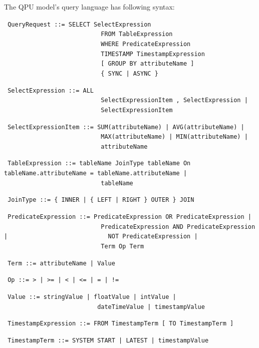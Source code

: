 \medskip
\noindent
The QPU model's query language has following syntax:

{\obeylines\obeyspaces
\texttt{
QueryRequest          ::=  SELECT SelectExpression
~~~~~~~~~~~~~~~~~~~~~~~~~~~FROM TableExpression
~~~~~~~~~~~~~~~~~~~~~~~~~~~WHERE PredicateExpression
~~~~~~~~~~~~~~~~~~~~~~~~~~~TIMESTAMP TimestampExpression 
~~~~~~~~~~~~~~~~~~~~~~~~~~~[ GROUP BY attributeName ]
~~~~~~~~~~~~~~~~~~~~~~~~~~~\{ SYNC | ASYNC \}
}}

{\obeylines\obeyspaces
\texttt{
SelectExpression      ::=  ALL
~~~~~~~~~~~~~~~~~~~~~~~~~~~SelectExpressionItem , SelectExpression |
~~~~~~~~~~~~~~~~~~~~~~~~~~~SelectExpressionItem
}}

{\obeylines\obeyspaces
\texttt{
SelectExpressionItem  ::=  SUM(attributeName) | AVG(attributeName) |
~~~~~~~~~~~~~~~~~~~~~~~~~~~MAX(attributeName) | MIN(attributeName) |
~~~~~~~~~~~~~~~~~~~~~~~~~~~attributeName
}}

{\obeylines\obeyspaces
\texttt{
TableExpression       ::=  tableName JoinType tableName On tableName.attributeName = tableName.attributeName |
~~~~~~~~~~~~~~~~~~~~~~~~~~~tableName
}}

{\obeylines\obeyspaces
\texttt{
JoinType              ::=  \{ INNER | \{ LEFT | RIGHT \} OUTER \} JOIN
}}

{\obeylines\obeyspaces
\texttt{
PredicateExpression   ::=  PredicateExpression OR PredicateExpression |
~~~~~~~~~~~~~~~~~~~~~~~~~~~PredicateExpression AND PredicateExpression |
~~~~~~~~~~~~~~~~~~~~~~~~~~~NOT PredicateExpression |
~~~~~~~~~~~~~~~~~~~~~~~~~~~Term Op Term
}}

{\obeylines\obeyspaces
\texttt{
Term                  ::=  attributeName | Value
}}

{\obeylines\obeyspaces
\texttt{
Op                    ::= > | >= | < | <= | = | !=
}}

{\obeylines\obeyspaces
\texttt{
Value                 ::= stringValue | floatValue | intValue |
~~~~~~~~~~~~~~~~~~~~~~~~~~dateTimeValue | timestampValue
}}

{\obeylines\obeyspaces
\texttt{
TimestampExpression   ::= FROM TimestampTerm [ TO TimestampTerm ]
}}

{\obeylines\obeyspaces
\texttt{
TimestampTerm         ::= SYSTEM START | LATEST | timestampValue
}}

